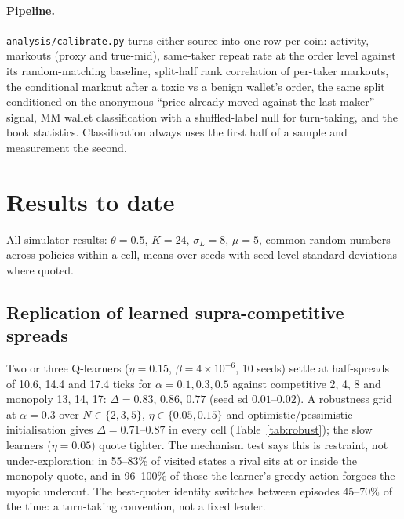\documentclass[11pt]{article}
\begin{document}
\paragraph{Pipeline.} \texttt{analysis/calibrate.py} turns either source into one row per coin: activity, markouts (proxy and true-mid), same-taker repeat rate at the order level against its random-matching baseline, split-half rank correlation of per-taker markouts, the conditional markout after a toxic vs a benign wallet's order, the same split conditioned on the anonymous ``price already moved against the last maker'' signal, MM wallet classification with a shuffled-label null for turn-taking, and the book statistics. Classification always uses the first half of a sample and measurement the second.

\section{Results to date}\label{sec:results}
All simulator results: $\theta=0.5$, $K=24$, $\sigma_L=8$, $\mu=5$, common random numbers across policies within a cell, means over seeds with seed-level standard deviations where quoted.

\subsection{Replication of learned supra-competitive spreads}
Two or three Q-learners ($\eta=0.15$, $\beta=4\times10^{-6}$, 10 seeds) settle at half-spreads of 10.6, 14.4 and 17.4 ticks for $\alpha=0.1,0.3,0.5$ against competitive 2, 4, 8 and monopoly 13, 14, 17: $\Delta=0.83$, $0.86$, $0.77$ (seed sd $0.01$--$0.02$). A robustness grid at $\alpha=0.3$ over $N\in\{2,3,5\}$, $\eta\in\{0.05,0.15\}$ and optimistic/pessimistic initialisation gives $\Delta=0.71$--$0.87$ in every cell (Table~\ref{tab:robust}); the slow learners ($\eta=0.05$) quote tighter. The mechanism test says this is restraint, not under-exploration: in 55--83\% of visited states a rival sits at or inside the monopoly quote, and in 96--100\% of those the learner's greedy action forgoes the myopic undercut. The best-quoter identity switches between episodes 45--70\% of the time: a turn-taking convention, not a fixed leader.
\end{document}
